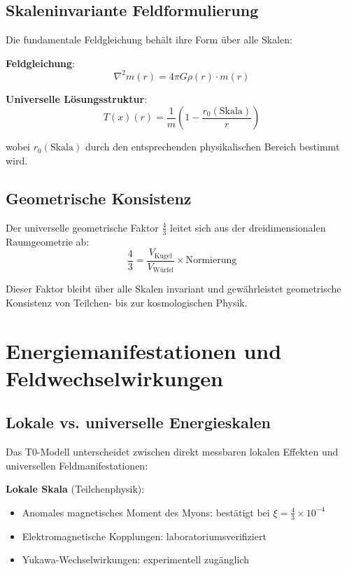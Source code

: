\documentclass[12pt,a4paper]{article}
\newcommand{\Tfield}{T(x)}
\begin{document}
	\subsection{Skaleninvariante Feldformulierung}
	\label{subsec:scale_independent}
	
	Die fundamentale Feldgleichung beh\"alt ihre Form \"uber alle Skalen:
	
	\textbf{Feldgleichung}:
	\begin{equation}
		\nabla^2 m(r) = 4\pi G \rho(r) \cdot m(r)
	\end{equation}
	
	\textbf{Universelle L\"osungsstruktur}:
	\begin{equation}
		\Tfield(r) = \frac{1}{m}\left(1 - \frac{r_0(\text{Skala})}{r}\right)
	\end{equation}
	
	wobei $r_0(\text{Skala})$ durch den entsprechenden physikalischen Bereich bestimmt wird.
	
	\subsection{Geometrische Konsistenz}
	\label{subsec:geometric_consistency}
	
	Der universelle geometrische Faktor $\frac{4}{3}$ leitet sich aus der dreidimensionalen Raumgeometrie ab:
	\begin{equation}
		\frac{4}{3} = \frac{V_{\text{Kugel}}}{V_{\text{W\"urfel}}} \times \text{Normierung}
	\end{equation}
	
	Dieser Faktor bleibt \"uber alle Skalen invariant und gew\"ahrleistet geometrische Konsistenz von Teilchen- bis zur kosmologischen Physik.
	
	\section{Energiemanifestationen und Feldwechselwirkungen}
	\label{sec:energy_manifestations}
	
	\subsection{Lokale vs. universelle Energieskalen}
	\label{subsec:local_universal}
	
	Das T0-Modell unterscheidet zwischen direkt messbaren lokalen Effekten und universellen Feldmanifestationen:
	
	\textbf{Lokale Skala} (Teilchenphysik):
	\begin{itemize}
		\item Anomales magnetisches Moment des Myons: best\"atigt bei $\xi = \frac{4}{3} \times 10^{-4}$
		\item Elektromagnetische Kopplungen: laboratoriumsverifiziert
		\item Yukawa-Wechselwirkungen: experimentell zug\"anglich
	\end{itemize}
	
\end{document}
